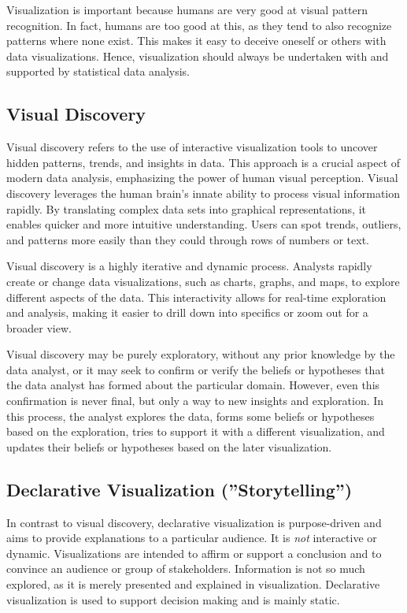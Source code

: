 Visualization is important because humans are very good at visual pattern recognition. In fact, humans are too good at this, as they tend to also recognize patterns where none exist. This makes it easy to deceive oneself or others with data visualizations. Hence, visualization should always be undertaken with and supported by statistical data analysis.

\subsection*{Visual Discovery}

Visual discovery refers to the use of interactive visualization tools to uncover hidden patterns, trends, and insights in data. This approach is a crucial aspect of modern data analysis, emphasizing the power of human visual perception. Visual discovery leverages the human brain's innate ability to process visual information rapidly. By translating complex data sets into graphical representations, it enables quicker and more intuitive understanding. Users can spot trends, outliers, and patterns more easily than they could through rows of numbers or text.

Visual discovery is a highly iterative and dynamic process. Analysts rapidly create or change data visualizations, such as charts, graphs, and maps, to explore different aspects of the data. This interactivity allows for real-time exploration and analysis, making it easier to drill down into specifics or zoom out for a broader view.

Visual discovery may be purely exploratory, without any prior knowledge by the data analyst, or it may seek to confirm or verify the beliefs or hypotheses that the data analyst has formed about the particular domain. However, even this confirmation is never final, but only a way to new insights and exploration. In this process, the analyst explores the data, forms some beliefs or hypotheses based on the exploration, tries to support it with a different visualization, and updates their beliefs or hypotheses based on the later visualization.

\subsection*{Declarative Visualization (''Storytelling'')}

In contrast to visual discovery, declarative visualization is purpose-driven and aims to provide explanations to a particular audience. It is \emph{not} interactive or dynamic. Visualizations are intended to affirm or support a conclusion and to convince an audience or group of stakeholders. Information is not so much explored, as it is merely presented and explained in visualization. Declarative visualization is used to support decision making and is mainly static. 

